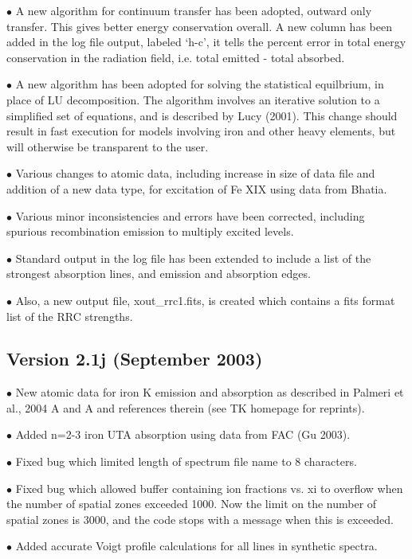 $\bullet$ A new algorithm for continuum transfer has been adopted, outward only 
transfer.  This gives better energy conservation overall.  A new column has been added
in the log file output, labeled `h-c', it tells the percent error in total energy conservation 
in the radiation field, i.e. total emitted - total absorbed.

$\bullet$ A new algorithm has been adopted for solving the statistical equilbrium,
in place of LU decomposition.  The algorithm involves an iterative solution to a 
simplified set of equations,  and is described by Lucy (2001). This change should result in
fast execution for models involving iron and other heavy elements, but will otherwise be 
transparent to the user.

$\bullet$ Various changes to atomic data, including increase in size of data file and 
addition of a new data type, for excitation of Fe XIX using data from Bhatia.

$\bullet$ Various minor inconsistencies and errors have been corrected, including 
spurious recombination emission to multiply excited levels.

$\bullet$ Standard output in the log file has been extended to include a list of the 
strongest absorption lines, and emission and absorption edges.

$\bullet$ Also, a new output file, xout\_rrc1.fits, is created which contains a fits format
list of the RRC strengths.


\subsection{Version 2.1j (September 2003)}

$\bullet$ New atomic data for iron K emission and absorption as described 
in Palmeri et al., 2004 A and A and references therein (see TK homepage 
for reprints). 

$\bullet$ Added n=2-3 iron UTA absorption using data from FAC (Gu 2003).

$\bullet$ Fixed bug which limited length of spectrum file name to 8 characters.

$\bullet$ Fixed bug which allowed buffer containing ion fractions vs. xi to overflow when 
the number of spatial zones exceeded 1000.  Now the limit on the number of spatial zones is 
3000, and the code stops with a message when this is exceeded.

$\bullet$ Added accurate Voigt profile calculations for all lines in synthetic spectra.

